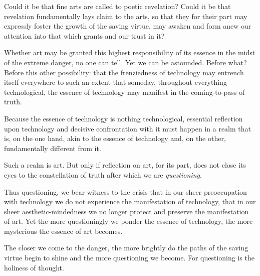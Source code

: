\documentclass[12pt]{article}
\begin{document}
Could it be that fine arts are called to poetic revelation? Could it be that revelation fundamentally lays claim to the arts, so that they for their part may expressly foster the growth of the saving virtue, may awaken and form anew our attention into that which grants and our trust in it?

Whether art may be granted this highest responsibility of its essence in the midst of the extreme danger, no one can tell. Yet we can be astounded. Before what? Before this other possibility: that the frenziedness of technology may entrench itself everywhere to such an extent that someday, throughout everything technological, the essence of technology may manifest in the coming-to-pass of truth.

Because the essence of technology is nothing technological, essential reflection upon technology and decisive confrontation with it must happen in a realm that is, on the one hand, akin to the essence of technology and, on the other, fundamentally different from it.

Such a realm is art. But only if reflection on art, for its part, does not close its eyes to the constellation of truth after which we are \textit{questioning}.

Thus questioning, we bear witness to the crisis that in our sheer preoccupation with technology we do not experience the manifestation of technology, that in our sheer aesthetic-mindedness we no longer protect and preserve the manifestation of art. Yet the more questioningly we ponder the essence of technology, the more mysterious the essence of art becomes.

The closer we come to the danger, the more brightly do the paths of the saving virtue begin to shine and the more questioning we become. For questioning is the holiness of thought.
\end{document}
